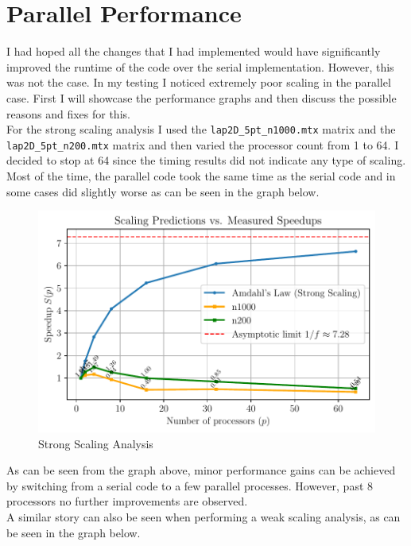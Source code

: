 \section{Parallel Performance}
I had hoped all the changes that I had implemented would have significantly improved the runtime of the code over the
serial implementation. However, this was not the case. In my testing I noticed extremely poor scaling in the parallel
case. First I will showcase the performance graphs and then discuss the possible reasons and fixes for this. \\

For the strong scaling analysis I used the \lstinline[language=Julia]|lap2D_5pt_n1000.mtx| matrix and the
\lstinline[language=Julia]|lap2D_5pt_n200.mtx| matrix and then varied the processor count from 1 to 64. I decided to
stop at 64 since the timing results did not indicate any type of scaling. Most of the time, the parallel code took the
same time as the serial code and in some cases did slightly worse as can be seen in the graph below. \\

\begin{figure}[h!]
    \centering
    \includegraphics[width=\textwidth]{plots/strong_scaling.pdf}
    \caption{Strong Scaling Analysis}
    \label{fig:StrongScaling}
\end{figure}
\FloatBarrier
As can be seen from the graph above, minor performance gains can be achieved by switching from a serial code to a few
parallel processes. However, past 8 processors no further improvements are observed. \\ A similar story can also be seen
when performing a weak scaling analysis, as can be seen in the graph below. \\

